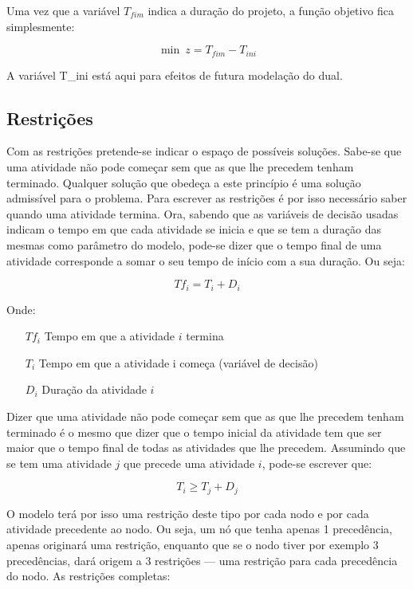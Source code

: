 Uma vez que a variável $T_{fim}$ indica a duração do projeto, a função
objetivo fica simplesmente:

\begin{displaymath} 
	\min~z = T_{fim}-T_{ini} 
\end{displaymath}

A variável T_{ini} está aqui para efeitos de futura modelação do dual.

\subsection{Restrições}

Com as restrições pretende-se indicar o espaço de possíveis soluções. Sabe-se
que uma atividade não pode começar sem que as que lhe precedem tenham terminado.
Qualquer solução que obedeça a este princípio é uma solução admissível para
o problema. Para escrever as restrições é por isso necessário saber quando uma
atividade termina. Ora, sabendo que as variáveis de decisão usadas indicam
o tempo em que cada atividade se inicia e que se tem a duração das mesmas como
parâmetro do modelo, pode-se dizer que o tempo final de uma atividade
corresponde a somar o seu tempo de início com a sua duração. Ou seja:

\begin{displaymath} Tf_{i} = T_{i} + D_{i} \end{displaymath}

Onde:

\begin{itemize} \item[$Tf_{i}$] Tempo em que a atividade $i$ termina
		\item[$T_{i}$] Tempo em que a atividade i começa (variável de decisão)
		\item[$D_{i}$] Duração da atividade $i$ \end{itemize}

Dizer que uma atividade não pode começar sem que as que lhe precedem tenham
terminado é o mesmo que dizer que o tempo inicial da atividade tem que ser maior
que o tempo final de todas as atividades que lhe precedem. Assumindo que se tem
uma atividade $j$ que precede uma atividade $i$, pode-se escrever que:

\begin{displaymath} T_{i} \geq T_{j} + D_{j} \end{displaymath}

O modelo terá por isso uma restrição deste tipo por cada nodo e por cada
atividade precedente ao nodo. Ou seja, um nó que tenha apenas 1 precedência,
apenas originará uma restrição, enquanto que se o nodo tiver por exemplo
3 precedências, dará origem a 3 restrições --- uma restrição para cada precedência
do nodo. 
As restrições completas:

